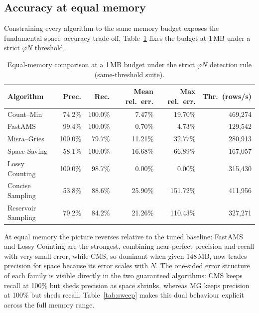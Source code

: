\documentclass[12pt]{article}
\begin{document}
\subsection{Accuracy at equal memory}
\label{sec:samemem}

Constraining every algorithm to the same memory budget exposes the fundamental
space--accuracy trade-off. Table~\ref{tab:samethresh} fixes the budget at
1\,MB under a strict $\varphi N$ threshold.

\begin{table}[H]
\centering
\small
\begin{tabular}{lrrrrr}
\hline
\textbf{Algorithm} & \textbf{Prec.} & \textbf{Rec.} & \textbf{Mean rel.\ err.} & \textbf{Max rel.\ err.} & \textbf{Thr.\ (rows/s)} \\
\hline
Count--Min         & 74.2\% & 100.0\% & 7.47\%  & 19.70\% & 469{,}274 \\
FastAMS            & 99.4\% & 100.0\% & 0.70\%  & 4.73\%  & 129{,}542 \\
Misra--Gries       & 100.0\%& 79.7\%  & 11.21\% & 32.77\% & 280{,}913 \\
Space-Saving       & 58.1\% & 100.0\% & 16.68\% & 66.89\% & 167{,}057 \\
Lossy Counting     & 100.0\%& 98.7\%  & 0.00\%  & 0.00\%  & 315{,}430 \\
Concise Sampling   & 53.8\% & 88.6\%  & 25.90\% & 151.72\%& 411{,}956 \\
Reservoir Sampling & 79.2\% & 84.2\%  & 21.26\% & 110.43\%& 327{,}271 \\
\hline
\end{tabular}
\caption{Equal-memory comparison at a 1\,MB budget under the strict $\varphi N$
detection rule (same-threshold suite).}
\label{tab:samethresh}
\end{table}

At equal memory the picture reverses relative to the tuned baseline: FastAMS and
Lossy Counting are the strongest, combining near-perfect precision and recall
with very small error, while CMS, so dominant when given 148\,MB, now
trades precision for space because its error scales with $N$. The one-sided
error structure of each family is visible directly in the two guaranteed
algorithms: CMS keeps recall at 100\% but sheds precision as space shrinks,
whereas MG keeps precision at 100\% but sheds recall. Table~\ref{tab:sweep}
makes this dual behaviour explicit across the full memory range.
\end{document}
